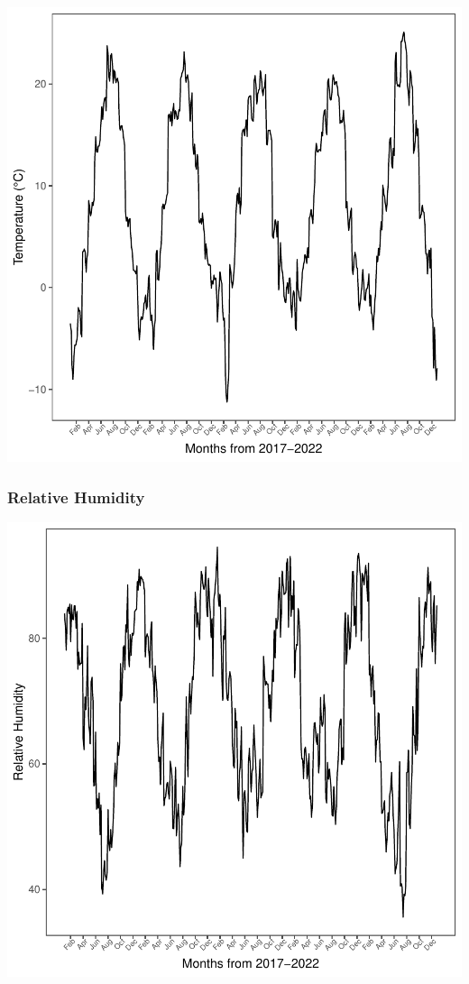 \documentclass[11pt, a4paper]{article}
\begin{document}
\includegraphics{variableinvestigation-035}


\subsubsection{Relative Humidity}

\includegraphics{variableinvestigation-036}
\end{document}
